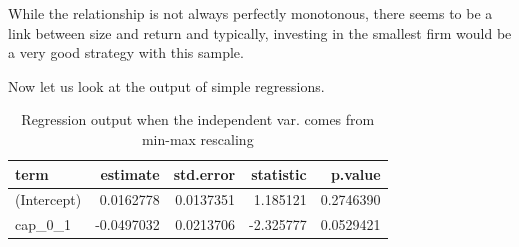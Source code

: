 \documentclass[]{krantz}
\makeatletter
\newenvironment{Shaded}{\begin{snugshade}}{\end{snugshade}}
\newcommand{\CommentTok}[1]{\textcolor[rgb]{0.37,0.37,0.37}{\textit{#1}}}
\newcommand{\DataTypeTok}[1]{\textcolor[rgb]{0.27,0.27,0.27}{#1}}
\newcommand{\DecValTok}[1]{\textcolor[rgb]{0.06,0.06,0.06}{#1}}
\newcommand{\KeywordTok}[1]{\textcolor[rgb]{0.27,0.27,0.27}{\textbf{#1}}}
\newcommand{\NormalTok}[1]{#1}
\newcommand{\OperatorTok}[1]{\textcolor[rgb]{0.43,0.43,0.43}{\textbf{#1}}}
\newcommand{\StringTok}[1]{\textcolor[rgb]{0.5,0.5,0.5}{#1}}
\newenvironment{kframe}{%
\medskip{}
\setlength{\fboxsep}{.8em}
 \def\at@end@of@kframe{}%
 \ifinner\ifhmode%
  \def\at@end@of@kframe{\end{minipage}}%
  \begin{minipage}{\columnwidth}%
 \fi\fi%
 \def\FrameCommand##1{\hskip\@totalleftmargin \hskip-\fboxsep
 \colorbox{shadecolor}{##1}\hskip-\fboxsep
     \hskip-\linewidth \hskip-\@totalleftmargin \hskip\columnwidth}%
 \MakeFramed {\advance\hsize-\width
   \@totalleftmargin\z@ \linewidth\hsize
   \@setminipage}}%
 {\par\unskip\endMakeFramed%
 \at@end@of@kframe}
\renewenvironment{Shaded}{\begin{kframe}}{\end{kframe}}
\theoremstyle{definition}
\theoremstyle{definition}
\theoremstyle{definition}
\theoremstyle{remark}
\makeatother
\begin{document}
While the relationship is not always perfectly monotonous, there seems
to be a link between size and return and typically, investing in the
smallest firm would be a very good strategy with this sample.

Now let us look at the output of simple regressions.

\footnotesize

\begin{Shaded}
\end{Shaded}

\begin{table}[t]

\caption{\label{tab:datatoyreg}Regression output when the independent var. comes 
                 from min-max rescaling}
\centering
\begin{tabular}{l|r|r|r|r}
\hline
term & estimate & std.error & statistic & p.value\\
\hline
(Intercept) & 0.0162778 & 0.0137351 & 1.185121 & 0.2746390\\
\hline
cap\_0\_1 & -0.0497032 & 0.0213706 & -2.325777 & 0.0529421\\
\hline
\end{tabular}
\end{table}

\normalsize

\footnotesize

\begin{Shaded}
\end{Shaded}
\end{document}
